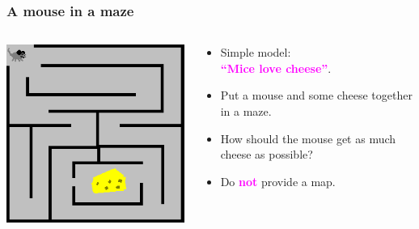 \documentclass{beamer}
\newlength{\wideitemsep}
\let\olditem\item
\renewcommand{\item}{\setlength{\itemsep}{\wideitemsep}\olditem}
\newcommand{\bspace}{\vspace{3mm}}
\newcommand{\hilite}[1]{\textcolor{magenta}{\textbf{#1}}}
\begin{document}
\begin{frame}
\frametitle{A mouse in a maze}
  \begin{columns}[T]
    \begin{column}{.5\textwidth}
        \includegraphics[width=\textwidth]{./media/mazeCheese}
    \end{column}

    \begin{column}{.5\textwidth}
    \begin{itemize}
        \item Simple model: \\ \hilite{``Mice love cheese''}.
        \bspace
        \item Put a mouse and some cheese together in a maze.
        \bspace
        \item How should the mouse get as much cheese as possible?
        \bspace
        \pause
        \item Do \hilite{not} provide a map.
    \end{itemize}
    \end{column}
  \end{columns}
\end{frame}
\end{document}
